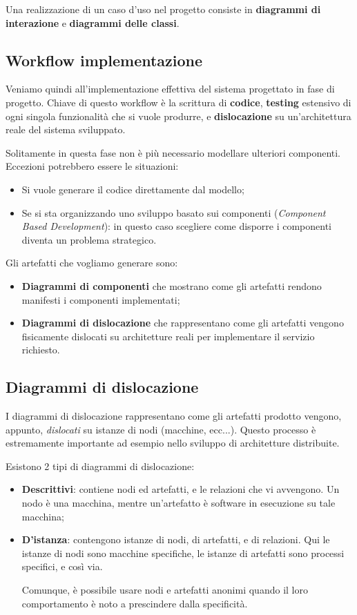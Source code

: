 \documentclass[a4paper,11pt]{article}
\begin{document}
Una realizzazione di un caso d’uso nel progetto consiste in \textbf{diagrammi di interazione} e \textbf{diagrammi delle classi}.

\subsection{Workflow implementazione}
Veniamo quindi all'implementazione effettiva del sistema progettato in fase di progetto. Chiave di questo workflow è la scrittura di \textbf{codice}, \textbf{testing} estensivo di ogni singola funzionalità che si vuole produrre, e \textbf{dislocazione} su un'architettura reale del sistema sviluppato.

Solitamente in questa fase non è più necessario modellare ulteriori componenti.
Eccezioni potrebbero essere le situazioni:
\begin{itemize}
	\item Si vuole generare il codice direttamente dal modello;
	\item Se si sta organizzando uno sviluppo basato sui componenti (\textit{Component Based Development}): in questo caso scegliere come disporre i componenti diventa un problema strategico.
\end{itemize}

Gli artefatti che vogliamo generare sono:
\begin{itemize}
	\item \textbf{Diagrammi di componenti} che mostrano come gli artefatti rendono manifesti i componenti implementati;
	\item \textbf{Diagrammi di dislocazione} che rappresentano come gli artefatti vengono fisicamente dislocati su architetture reali per implementare il servizio richiesto. 
\end{itemize}

\subsection{Diagrammi di dislocazione}
I diagrammi di dislocazione rappresentano come gli artefatti prodotto vengono, appunto, \textit{dislocati} su istanze di nodi (macchine, ecc...).
Questo processo è estremamente importante ad esempio nello sviluppo di architetture distribuite.

Esistono 2 tipi di diagrammi di dislocazione:
\begin{itemize}
	\item \textbf{Descrittivi}: contiene nodi ed artefatti, e le relazioni che vi avvengono. Un nodo è una macchina, mentre un'artefatto è software in esecuzione su tale macchina; 
	\item \textbf{D'istanza}: contengono istanze di nodi, di artefatti, e di relazioni. Qui le istanze di nodi sono macchine specifiche, le istanze di artefatti sono processi specifici, e così via. 

		Comunque, è possibile usare nodi e artefatti anonimi quando il loro comportamento è noto a prescindere dalla specificità. 
\end{itemize}
\end{document}
